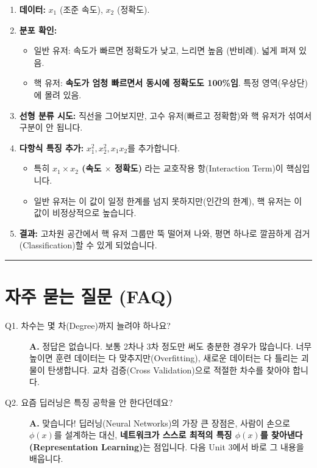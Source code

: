 \documentclass[11pt,a4paper]{book}
\theoremstyle{definition}
\begin{document}
\begin{enumerate}
    \item \textbf{데이터:} $x_1$ (조준 속도), $x_2$ (정확도).
    \item \textbf{분포 확인:}
    \begin{itemize}
        \item 일반 유저: 속도가 빠르면 정확도가 낮고, 느리면 높음 (반비례). 넓게 퍼져 있음.
        \item 핵 유저: \textbf{속도가 엄청 빠르면서 동시에 정확도도 100\%임}. 특정 영역(우상단)에 몰려 있음.
    \end{itemize}
    \item \textbf{선형 분류 시도:} 직선을 그어보지만, 고수 유저(빠르고 정확함)와 핵 유저가 섞여서 구분이 안 됩니다.
    \item \textbf{다항식 특징 추가:} $x_1^2, x_2^2, x_1 x_2$를 추가합니다.
    \begin{itemize}
        \item 특히 \textbf{$x_1 \times x_2$ (속도 $\times$ 정확도)} 라는 교호작용 항(Interaction Term)이 핵심입니다.
        \item 일반 유저는 이 값이 일정 한계를 넘지 못하지만(인간의 한계), 핵 유저는 이 값이 비정상적으로 높습니다.
    \end{itemize}
    \item \textbf{결과:} 고차원 공간에서 핵 유저 그룹만 뚝 떨어져 나와, 평면 하나로 깔끔하게 검거(Classification)할 수 있게 되었습니다.
\end{enumerate}

\vspace{0.5cm}\hrule\vspace{0.5cm}

\section{자주 묻는 질문 (FAQ)}

\begin{description}
    \item[Q1. 차수는 몇 차(Degree)까지 늘려야 하나요?]
    \textbf{A.} 정답은 없습니다. 보통 2차나 3차 정도만 써도 충분한 경우가 많습니다. 너무 높이면 훈련 데이터는 다 맞추지만(Overfitting), 새로운 데이터는 다 틀리는 괴물이 탄생합니다. 교차 검증(Cross Validation)으로 적절한 차수를 찾아야 합니다.
    
    \item[Q2. 요즘 딥러닝은 특징 공학을 안 한다던데요?]
    \textbf{A.} 맞습니다! 딥러닝(Neural Networks)의 가장 큰 장점은, 사람이 손으로 $\phi(x)$를 설계하는 대신, \textbf{네트워크가 스스로 최적의 특징 $\phi(x)$를 찾아낸다(Representation Learning)}는 점입니다. 다음 Unit 3에서 바로 그 내용을 배웁니다.
\end{description}
\end{document}
